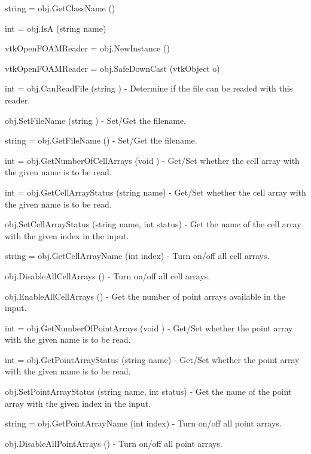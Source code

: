 \begin{DoxyItemize}
\item {\ttfamily string = obj.\-Get\-Class\-Name ()}  
\item {\ttfamily int = obj.\-Is\-A (string name)}  
\item {\ttfamily vtk\-Open\-F\-O\-A\-M\-Reader = obj.\-New\-Instance ()}  
\item {\ttfamily vtk\-Open\-F\-O\-A\-M\-Reader = obj.\-Safe\-Down\-Cast (vtk\-Object o)}  
\item {\ttfamily int = obj.\-Can\-Read\-File (string )} -\/ Determine if the file can be readed with this reader.  
\item {\ttfamily obj.\-Set\-File\-Name (string )} -\/ Set/\-Get the filename.  
\item {\ttfamily string = obj.\-Get\-File\-Name ()} -\/ Set/\-Get the filename.  
\item {\ttfamily int = obj.\-Get\-Number\-Of\-Cell\-Arrays (void )} -\/ Get/\-Set whether the cell array with the given name is to be read.  
\item {\ttfamily int = obj.\-Get\-Cell\-Array\-Status (string name)} -\/ Get/\-Set whether the cell array with the given name is to be read.  
\item {\ttfamily obj.\-Set\-Cell\-Array\-Status (string name, int status)} -\/ Get the name of the cell array with the given index in the input.  
\item {\ttfamily string = obj.\-Get\-Cell\-Array\-Name (int index)} -\/ Turn on/off all cell arrays.  
\item {\ttfamily obj.\-Disable\-All\-Cell\-Arrays ()} -\/ Turn on/off all cell arrays.  
\item {\ttfamily obj.\-Enable\-All\-Cell\-Arrays ()} -\/ Get the number of point arrays available in the input.  
\item {\ttfamily int = obj.\-Get\-Number\-Of\-Point\-Arrays (void )} -\/ Get/\-Set whether the point array with the given name is to be read.  
\item {\ttfamily int = obj.\-Get\-Point\-Array\-Status (string name)} -\/ Get/\-Set whether the point array with the given name is to be read.  
\item {\ttfamily obj.\-Set\-Point\-Array\-Status (string name, int status)} -\/ Get the name of the point array with the given index in the input.  
\item {\ttfamily string = obj.\-Get\-Point\-Array\-Name (int index)} -\/ Turn on/off all point arrays.  
\item {\ttfamily obj.\-Disable\-All\-Point\-Arrays ()} -\/ Turn on/off all point arrays.  

\end{DoxyItemize}
